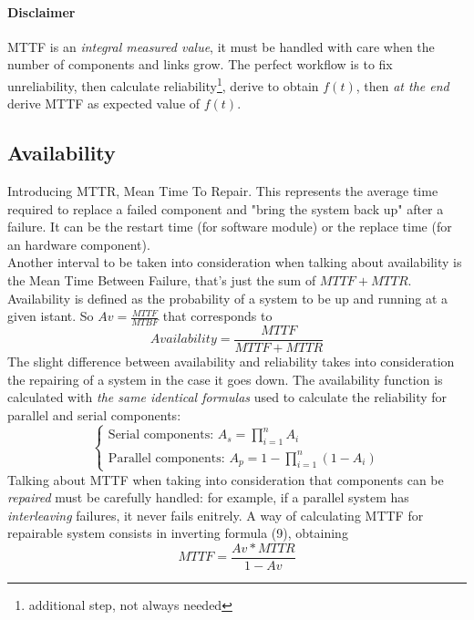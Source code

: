 \documentclass{article}
\begin{document}
				\paragraph{Disclaimer}
				MTTF is an \textit{integral measured value}, it must be handled with care when the number of components and links grow. The perfect workflow is to fix unreliability, then calculate reliability\footnote{additional step, not always needed}, derive to obtain $f(t)$, then \textit{at the end} derive MTTF as expected value of $f(t)$.

			\subsection{Availability}
				Introducing MTTR, Mean Time To Repair. This represents the average time required to replace a failed component and "bring the system back up" after a failure. It can be the restart time (for software module) or the replace time (for an hardware component).\\
				Another interval to be taken into consideration when talking about availability is the Mean Time Between Failure, that's just the sum of $MTTF + MTTR$. Availability is defined as the probability of a system to be up and running at a given istant. So $Av = \frac{MTTF}{MTBF}$ that corresponds to
				\begin{equation}
					Availability = \frac{MTTF}{MTTF+MTTR}
				\end{equation}
				The slight difference between availability and reliability takes into consideration the repairing of a system in the case it goes down. The availability function is calculated with \emph{the same identical formulas} used to calculate the reliability for parallel and serial components:
				\begin{equation}
					\begin{cases}
						\text{Serial components: } A_s = \prod_{i = 1}^n A_i \\
						\text{Parallel components: } A_p = 1 - \prod_{i = 1}^n (1 - A_i)
					\end{cases}
				\end{equation}
				Talking about MTTF when taking into consideration that components can be \emph{repaired} must be carefully handled: for example, if a parallel system has \emph{interleaving} failures, it never fails enitrely. A way of calculating MTTF for repairable system consists in inverting formula (9), obtaining
				\begin{equation}
					MTTF = \frac{Av*MTTR}{1-Av}
				\end{equation}
\end{document}
